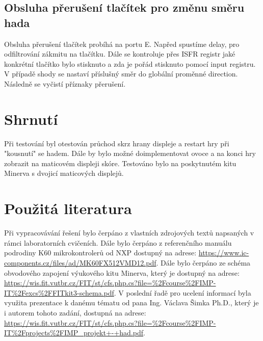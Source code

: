 \documentclass[12pt,english]{article}
\begin{document}
\subsection{Obsluha přerušení tlačítek pro změnu směru hada}
Obsluha přerušení tlačítek probíhá na portu E. Napřed spustíme delay, pro odfiltrování zákmitu na tlačítku. Dále se kontroluje přes ISFR registr jaké konkrétní tlačítko bylo stisknuto a zda je pořád stisknuto pomocí input registru. V případě shody se nastaví příslušný směr do globální proměnné direction. Následně se vyčistí příznaky přerušení.

\newpage
\section{Shrnutí}
Při testování byl otestován průchod skrz hrany displeje a restart hry při "kousnutí" se hadem. Dále by bylo možné doimplementovat ovoce a na konci hry zobrazit na maticovém displeji skóre. Testováno bylo na poskytnutém kitu Minerva s dvojicí maticových displejů.
\newpage
\section{Použitá literatura}
Při vypracovávání řešení bylo čerpáno z vlastních zdrojových textů napsaných v rámci laboratorních cvičeních. Dále bylo čerpáno z referenčního manuálu podrodiny K60 mikrokontrolerů od NXP dostupný na adrese: \url{https://www.ic-components.cz/files/ad/MK60FX512VMD12.pdf}. Dále bylo čerpáno ze schéma obvodového zapojení výukového kitu Minerva, který je dostupný na adrese: \url{https://wis.fit.vutbr.cz/FIT/st/cfs.php.cs?file=\%2Fcourse\%2FIMP-IT\%2Fexcs\%2FFITkit3-schema.pdf}. V poslední řadě pro ucelení informací byla využita prezentace k danému tématu od pana Ing. Václava Šimka Ph.D., který je i autorem tohoto zadání, dostupná na adrese: \\\url{https://wis.fit.vutbr.cz/FIT/st/cfs.php.cs?file=\%2Fcourse\%2FIMP-IT\%2Fprojects\%2FIMP\_projekt+-+had.pdf}.
\end{document}
